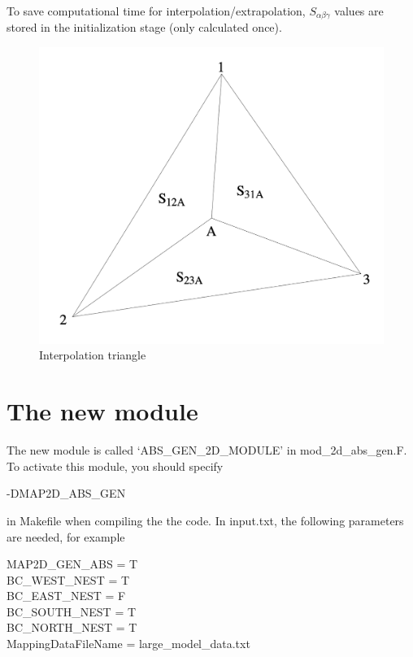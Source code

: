 \documentclass[preprint,10pt]{elsarticle}
\begin{document}
To save computational time for interpolation/extrapolation, $S_{\alpha
\beta \gamma}$ values are stored in the initialization stage (only calculated once).  
  
 \begin{figure}
\begin{center}
 \includegraphics[width=1.0\textwidth]{figures/triangle.png}
 \caption{Interpolation triangle }
 \label{triangle}
 \end{center}
 \end{figure}
  

\section{The new module}
   
 The new module is called  `ABS\_GEN\_2D\_MODULE' in mod\_2d\_abs\_gen.F. To activate this module, you should specify 
 
  -DMAP2D\_ABS\_GEN
  
  in Makefile when compiling the the code. In input.txt, the following parameters are needed, for example
  
 \noindent 
MAP2D\_GEN\_ABS = T \\
BC\_WEST\_NEST = T \\
BC\_EAST\_NEST = F \\
BC\_SOUTH\_NEST = T  \\
BC\_NORTH\_NEST = T  \\
MappingDataFileName = large\_model\_data.txt   
 
\end{document}
